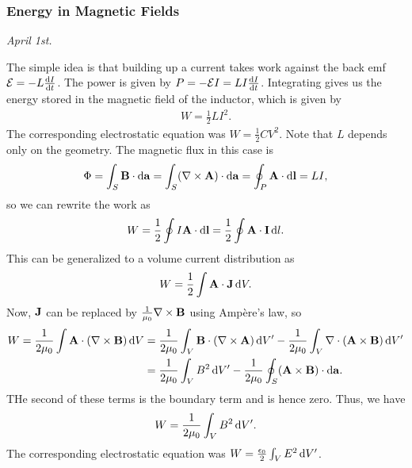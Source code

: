 \subsubsection{Energy in Magnetic Fields}
\textit{April 1st.}

The simple idea is that building up a current takes work against the back emf $\mathcal{E} = -L \frac{\mathrm{d}I}{\mathrm{d}t}$. The power is given by $P = -\mathcal{E} I = L I \frac{\mathrm{d}I}{\mathrm{d}t}$. Integrating gives us the energy stored in the magnetic field of the inductor, which is given by
\begin{align}
    W = \frac{1}{2} LI^{2}.
\end{align}
The corresponding electrostatic equation was $W = \frac{1}{2} CV^{2}$. Note that $L$ depends only on the geometry. The magnetic flux in this case is
\begin{align}
    \Phi = \int_{S} \mathbf{B} \cdot \mathrm{d}\mathbf{a} = \int_{S} (\nabla \times \mathbf{A}) \cdot \mathrm{d}\mathbf{a} = \oint_{P} \mathbf{A} \cdot \mathrm{d}\mathbf{l} = LI,
\end{align}
so we can rewrite the work as
\begin{align}
    W = \frac{1}{2} \oint I\mathbf{A} \cdot \mathrm{d}\mathbf{l} = \frac{1}{2} \oint \mathbf{A} \cdot \mathbf{I} \, \mathrm{d}l.
\end{align}
This can be generalized to a volume current distribution as
\begin{align}
    W = \frac{1}{2} \int \mathbf{A} \cdot \mathbf{J} \, \mathrm{d}V.
\end{align}
Now, $\mathbf{J}$ can be replaced by $\frac{1}{\mu_{0}} \nabla \times \mathbf{B}$ using Ampère's law, so
\begin{align}
    W = \frac{1}{2 \mu_{0}} \int \mathbf{A} \cdot (\nabla \times \mathbf{B}) \, \mathrm{d}V &= \frac{1}{2 \mu_{0}} \int_{V} \mathbf{B} \cdot (\nabla \times \mathbf{A}) \, \mathrm{d}V' - \frac{1}{2 \mu_{0}} \int_{V} \nabla \cdot (\mathbf{A} \times \mathbf{B}) \, \mathrm{d}V' \notag \\ &= \frac{1}{2 \mu_{0}} \int_{V} B^{2} \, \mathrm{d}V' - \frac{1}{2 \mu_{0}} \oint_{S} (\mathbf{A} \times \mathbf{B}) \cdot \mathrm{d}\mathbf{a}.
\end{align}
THe second of these terms is the boundary term and is hence zero. Thus, we have
\begin{align}
    W = \frac{1}{2 \mu_{0}} \int_{V} B^{2} \, \mathrm{d}V'.
\end{align}
The corresponding electrostatic equation was $W = \frac{\epsilon_{0}}{2} \int_{V} E^{2} \, \mathrm{d}V'$. 

